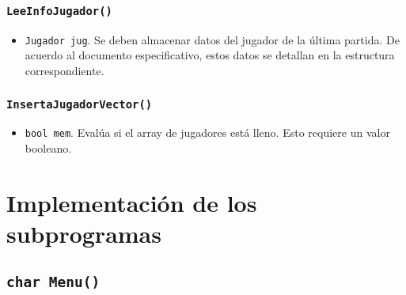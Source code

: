 \documentclass[12pt]{article}
\begin{document}
\subsubsection*{\texttt{LeeInfoJugador()}}

\begin{itemize}

\item \texttt{Jugador jug}. Se deben almacenar datos del jugador de la
última partida. De acuerdo al documento especificativo, estos datos se detallan
en la estructura correspondiente.

\end{itemize}

\subsubsection*{\texttt{InsertaJugadorVector()}}

\begin{itemize}

\item \texttt{bool mem}. Evalúa si el array de jugadores está lleno.
Esto requiere un valor booleano.

\end{itemize}

\clearpage

\section*{Implementación de los subprogramas}

\subsection*{\texttt{char Menu()}}
\end{document}
